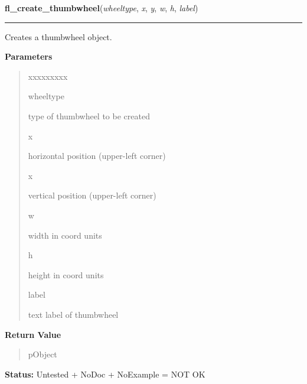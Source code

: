 \hspace{.8\funcindent}\begin{boxedminipage}{\funcwidth}

    \raggedright \textbf{fl\_create\_thumbwheel}(\textit{wheeltype}, \textit{x}, \textit{y}, \textit{w}, \textit{h}, \textit{label})

    \vspace{-1.5ex}

    \rule{\textwidth}{0.5\fboxrule}
\setlength{\parskip}{2ex}
    Creates a thumbwheel object.

\setlength{\parskip}{1ex}
      \textbf{Parameters}
      \vspace{-1ex}

      \begin{quote}
        \begin{Ventry}{xxxxxxxxx}

          \item[wheeltype]

          type of thumbwheel to be created

          \item[x]

          horizontal position (upper-left corner)

          \item[x]

          vertical position (upper-left corner)

          \item[w]

          width in coord units

          \item[h]

          height in coord units

          \item[label]

          text label of thumbwheel

        \end{Ventry}

      \end{quote}

      \textbf{Return Value}
    \vspace{-1ex}

      \begin{quote}
      pObject

      \end{quote}

\textbf{Status:} Untested + NoDoc + NoExample = NOT OK



    \end{boxedminipage}

